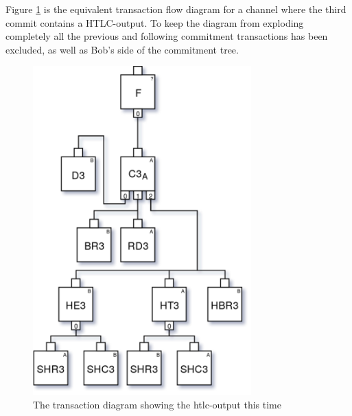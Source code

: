 Figure \ref{fig:pc-htlc} is the equivalent transaction flow diagram for a channel where the third commit contains a HTLC-output. To keep the diagram from exploding completely all the previous and following commitment transactions has been excluded, as well as Bob's side of the commitment tree. 

\begin{figure}[H]
	\centering
	\includegraphics[width=0.75\textwidth]{background/images/payment_channel_htlc.png}
	\caption{The transaction diagram showing the htlc-output this time}
	\label{fig:pc-htlc}
\end{figure}

